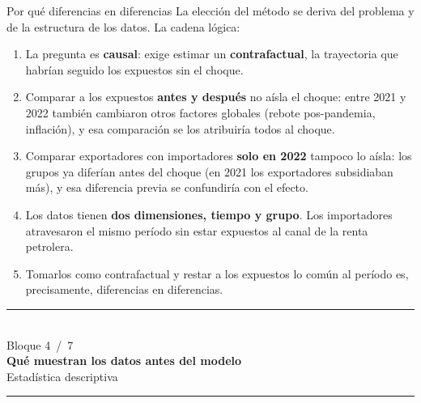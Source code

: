 \documentclass[aspectratio=169,10pt]{beamer}
\newcommand{\key}[1]{{\bfseries\color{AcentoRojo}#1}}
\newcommand{\divisor}[3]{%
  {\setbeamertemplate{footline}{}%
   \begin{frame}[plain]
     \vfill
     \begin{center}
       {\color{AcentoRojo}\rule{2.6cm}{1.2pt}}\\[0.7em]
       {\scriptsize\color{GrisMedio}Bloque #1 \,/\, 7}\\[0.6em]
       {\Large\color{Carbon}\bfseries #2}\\[0.45em]
       {\color{GrisMedio}#3}\\[0.7em]
       {\color{AcentoRojo}\rule{2.6cm}{1.2pt}}
     \end{center}
     \vfill
   \end{frame}}}
\begin{document}
\begin{frame}{Por qué diferencias en diferencias}
  \small
  La elección del método se deriva del problema y de la estructura de los datos. La cadena lógica:
  \begin{enumerate}
    \item La pregunta es \textbf{causal}: exige estimar un \textbf{contrafactual}, la trayectoria
          que habrían seguido los expuestos sin el choque.
    \item Comparar a los expuestos \textbf{antes y después} no aísla el choque: entre 2021 y 2022
          también cambiaron otros factores globales (rebote pos-pandemia, inflación), y esa
          comparación se los atribuiría todos al choque.
    \item Comparar exportadores con importadores \textbf{solo en 2022} tampoco lo aísla: los grupos
          ya diferían antes del choque (en 2021 los exportadores subsidiaban más), y esa diferencia
          previa se confundiría con el efecto.
    \item Los datos tienen \key{dos dimensiones, tiempo y grupo}. Los importadores atravesaron el
          mismo período sin estar expuestos al canal de la renta petrolera.
    \item Tomarlos como contrafactual y restar a los expuestos lo común al período
          \alert{es, precisamente, diferencias en diferencias}.
  \end{enumerate}

\end{frame}

\divisor{4}{Qué muestran los datos antes del modelo}{Estadística descriptiva}
\end{document}

